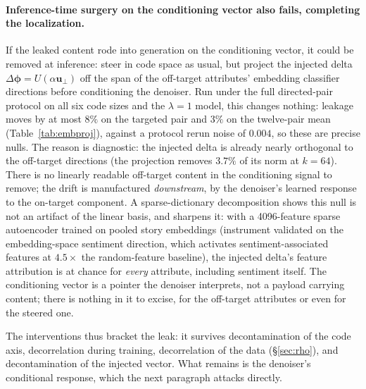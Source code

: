 \documentclass[11pt]{article}
\newcommand{\phib}{\bm{\phi}}
\begin{document}
\paragraph{Inference-time surgery on the conditioning vector also fails, completing
the localization.} If the leaked content rode into generation on the conditioning
vector, it could be removed at inference: steer in code space as usual, but project
the injected delta $\Delta\phib=U(\alpha\bm u_\perp)$ off the span of the off-target
attributes' embedding classifier directions before conditioning the denoiser. Run
under the full directed-pair protocol on all six code sizes and the $\lambda{=}1$
model, this changes nothing: leakage moves by at most $8\%$ on the targeted pair and
$3\%$ on the twelve-pair mean (Table~\ref{tab:embproj}), against a protocol rerun
noise of $0.004$, so these are precise nulls. The reason is diagnostic: the injected
delta is already nearly orthogonal to the off-target directions (the projection
removes $3.7\%$ of its norm at $k{=}64$). There is no linearly readable off-target
content in the conditioning signal to remove; the drift is manufactured
\emph{downstream}, by the denoiser's learned response to the on-target component.
A sparse-dictionary decomposition shows this null is not an artifact of the
linear basis, and sharpens it: with a 4096-feature sparse autoencoder trained
on pooled story embeddings (instrument validated on the embedding-space
sentiment direction, which activates sentiment-associated features at
$4.5\times$ the random-feature baseline), the injected delta's feature
attribution is at chance for \emph{every} attribute, including sentiment
itself. The conditioning vector is a pointer the denoiser interprets, not a
payload carrying content; there is nothing in it to excise, for the off-target
attributes or even for the steered one.

The interventions thus bracket the leak: it survives decontamination of the code
axis, decorrelation during training, decorrelation of the data (\S\ref{sec:rho}),
and decontamination of the injected vector. What remains is the denoiser's
conditional response, which the next paragraph attacks directly.
\end{document}
